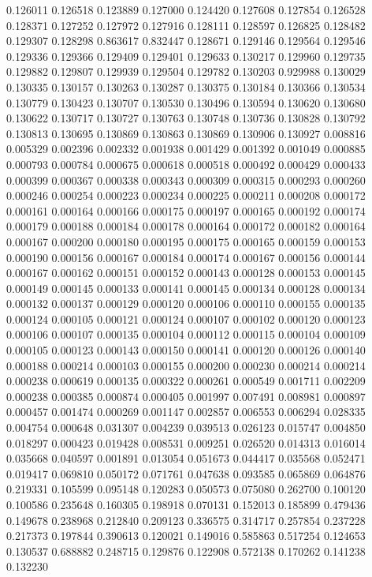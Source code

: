 0.126011
0.126518
0.123889
0.127000
0.124420
0.127608
0.127854
0.126528
0.128371
0.127252
0.127972
0.127916
0.128111
0.128597
0.126825
0.128482
0.129307
0.128298
0.863617
0.832447
0.128671
0.129146
0.129564
0.129546
0.129336
0.129366
0.129409
0.129401
0.129633
0.130217
0.129960
0.129735
0.129882
0.129807
0.129939
0.129504
0.129782
0.130203
0.929988
0.130029
0.130335
0.130157
0.130263
0.130287
0.130375
0.130184
0.130366
0.130534
0.130779
0.130423
0.130707
0.130530
0.130496
0.130594
0.130620
0.130680
0.130622
0.130717
0.130727
0.130763
0.130748
0.130736
0.130828
0.130792
0.130813
0.130695
0.130869
0.130863
0.130869
0.130906
0.130927
0.008816
0.005329
0.002396
0.002332
0.001938
0.001429
0.001392
0.001049
0.000885
0.000793
0.000784
0.000675
0.000618
0.000518
0.000492
0.000429
0.000433
0.000399
0.000367
0.000338
0.000343
0.000309
0.000315
0.000293
0.000260
0.000246
0.000254
0.000223
0.000234
0.000225
0.000211
0.000208
0.000172
0.000161
0.000164
0.000166
0.000175
0.000197
0.000165
0.000192
0.000174
0.000179
0.000188
0.000184
0.000178
0.000164
0.000172
0.000182
0.000164
0.000167
0.000200
0.000180
0.000195
0.000175
0.000165
0.000159
0.000153
0.000190
0.000156
0.000167
0.000184
0.000174
0.000167
0.000156
0.000144
0.000167
0.000162
0.000151
0.000152
0.000143
0.000128
0.000153
0.000145
0.000149
0.000145
0.000133
0.000141
0.000145
0.000134
0.000128
0.000134
0.000132
0.000137
0.000129
0.000120
0.000106
0.000110
0.000155
0.000135
0.000124
0.000105
0.000121
0.000124
0.000107
0.000102
0.000120
0.000123
0.000106
0.000107
0.000135
0.000104
0.000112
0.000115
0.000104
0.000109
0.000105
0.000123
0.000143
0.000150
0.000141
0.000120
0.000126
0.000140
0.000188
0.000214
0.000103
0.000155
0.000200
0.000230
0.000214
0.000214
0.000238
0.000619
0.000135
0.000322
0.000261
0.000549
0.001711
0.002209
0.000238
0.000385
0.000874
0.000405
0.001997
0.007491
0.008981
0.000897
0.000457
0.001474
0.000269
0.001147
0.002857
0.006553
0.006294
0.028335
0.004754
0.000648
0.031307
0.004239
0.039513
0.026123
0.015747
0.004850
0.018297
0.000423
0.019428
0.008531
0.009251
0.026520
0.014313
0.016014
0.035668
0.040597
0.001891
0.013054
0.051673
0.044417
0.035568
0.052471
0.019417
0.069810
0.050172
0.071761
0.047638
0.093585
0.065869
0.064876
0.219331
0.105599
0.095148
0.120283
0.050573
0.075080
0.262700
0.100120
0.100586
0.235648
0.160305
0.198918
0.070131
0.152013
0.185899
0.479436
0.149678
0.238968
0.212840
0.209123
0.336575
0.314717
0.257854
0.237228
0.217373
0.197844
0.390613
0.120021
0.149016
0.585863
0.517254
0.124653
0.130537
0.688882
0.248715
0.129876
0.122908
0.572138
0.170262
0.141238
0.132230
